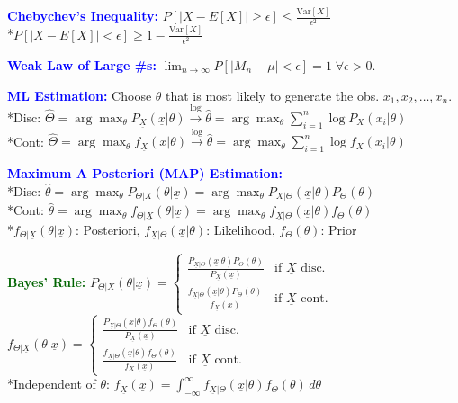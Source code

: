 \documentclass[5pt]{extarticle} %
\begin{document}
\begin{paracol}{3}
{    \textcolor{blue}{\textbf{Chebychev's Inequality:}} $P[|X - E[X]| \geq \epsilon] \leq \frac{\text{Var}[X]}{\epsilon^2}$ \\
    *$P[|X - E[X] | < \epsilon] \geq 1 - \frac{\text{Var}[X]}{\epsilon^2}$

    \textcolor{blue}{\textbf{Weak Law of Large \#s:}} $\lim_{n \to \infty} P[|M_n - \mu| < \epsilon] = 1 \; \forall \epsilon > 0$.

    \textcolor{blue}{\textbf{ML Estimation:}} Choose $\theta$ that is most likely to generate the obs. $x_1, x_2, \ldots, x_n$. \\
    *Disc: $\hat{\Theta} = \arg \max_\theta P_{\underline{X}} (\underline{x} | \theta) \overset{\text{log}}{\rightarrow} \hat{\theta} = \arg \max_\theta \sum_{i=1}^n \log P_X(x_i | \theta)$ \\
    *Cont: $\hat{\Theta} = \arg \max_\theta f_{\underline{X}} (\underline{x} | \theta) \overset{\text{log}}{\rightarrow} \hat{\theta} = \arg \max_\theta \sum_{i=1}^n \log f_X(x_i | \theta)$

    \textcolor{blue}{\textbf{Maximum A Posteriori (MAP) Estimation:}} \\
    *Disc: $\hat{\theta} = \arg \max_\theta P_{\Theta | \underline{X}} (\theta | \underline{x}) = \arg \max_\theta P_{\underline{X} | \Theta} (\underline{x} | \theta) P_\Theta (\theta)$\\
    *Cont: $\hat{\theta} = \arg \max_\theta f_{\Theta | \underline{X}} (\theta | \underline{x}) = \arg \max_\theta f_{\underline{X} | \Theta} (\underline{x} | \theta) f_\Theta (\theta)$ \\
    *$f_{\Theta | \underline{X}} (\theta | \underline{x})$: Posteriori, $f_{\underline{X} | \Theta} (\underline{x} | \theta)$: Likelihood, $f_\Theta (\theta)$: Prior

    \textcolor{darkgreen}{\textbf{Bayes' Rule:}} $P_{\Theta | \underline{X}} (\theta | \underline{x}) = \begin{cases}
        \frac{P_{\underline{X} | \Theta} (\underline{x} | \theta) P_\Theta (\theta)}{P_{\underline{X}} (\underline{x})} & \text{if } \underline{X} \text{ disc.} \\
        \frac{f_{\underline{X} | \Theta} (\underline{x} | \theta) P_\Theta (\theta)}{f_{\underline{X}} (\underline{x})} & \text{if } \underline{X} \text{ cont.}
    \end{cases}$ \\
    $f_{\Theta | \underline{X}} (\theta | \underline{x}) = \begin{cases}
        \frac{P_{\underline{X} | \Theta} (\underline{x} | \theta) f_\Theta (\theta)}{P_{\underline{X}} (\underline{x})} & \text{if } \underline{X} \text{ disc.} \\
        \frac{f_{\underline{X} | \Theta} (\underline{x} | \theta) f_\Theta (\theta)}{f_{\underline{X}} (\underline{x})} & \text{if } \underline{X} \text{ cont.} 
    \end{cases}$ \\
    *Independent of $\theta$: $f_{\underline{X}} (\underline{x}) = \int_{-\infty}^{\infty} f_{\underline{X} | \Theta} (\underline{x} | \theta) f_\Theta (\theta) \, d\theta$ \\

}
\end{paracol}
\end{document}
